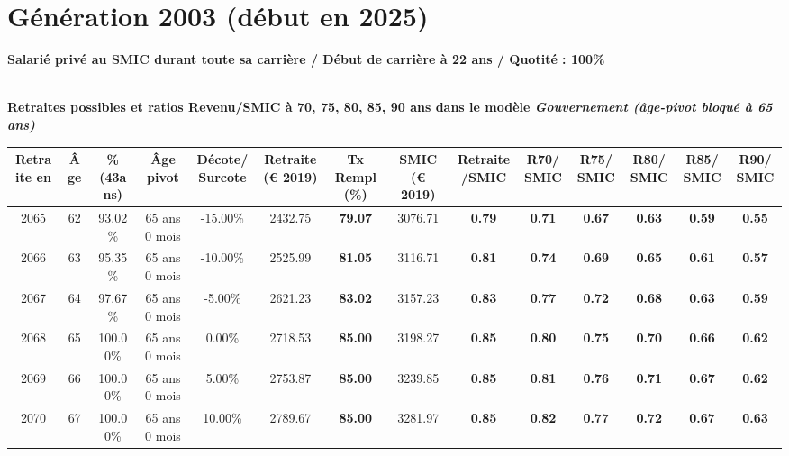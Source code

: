 \newpage 
 
\section{Génération 2003 (début en 2025)\label{SMIC_100_2003_22_0}} 
 
{\bf \noindent Salarié privé au SMIC durant toute sa carrière / Début de carrière à 22 ans / Quotité : 100\%}  ~ 

 ~\\{\bf \noindent Retraites possibles et ratios Revenu/SMIC à 70, 75, 80, 85, 90 ans dans le modèle \emph{Gouvernement (âge-pivot bloqué à 65 ans)}}  
 
\begin{adjustbox}{max width=\textwidth} 
\begin{tabular}[htb]{|c|c||c|c|c||c|c||c|c||c|c|c|c|c|} 
\hline 
 Retraite en &  Âge &  \%(43ans) &  Âge pivot &  Décote/Surcote &  Retraite (\euro{} 2019) &  Tx Rempl(\%) &  SMIC (\euro{} 2019) &  Retraite/SMIC &  R70/SMIC &  R75/SMIC &  R80/SMIC &  R85/SMIC &  R90/SMIC \\ 
\hline \hline 
 2065 &  62 &  93.02\% &  65 ans 0 mois &  -15.00\% &  2432.75 &  {\bf 79.07} &  3076.71 &  {\bf {\color{red} 0.79}} &  {\bf {\color{red} 0.71}} &  {\bf {\color{red} 0.67}} &  {\bf {\color{red} 0.63}} &  {\bf {\color{red} 0.59}} &  {\bf {\color{red} 0.55}} \\ 
\hline 
 2066 &  63 &  95.35\% &  65 ans 0 mois &  -10.00\% &  2525.99 &  {\bf 81.05} &  3116.71 &  {\bf {\color{red} 0.81}} &  {\bf {\color{red} 0.74}} &  {\bf {\color{red} 0.69}} &  {\bf {\color{red} 0.65}} &  {\bf {\color{red} 0.61}} &  {\bf {\color{red} 0.57}} \\ 
\hline 
 2067 &  64 &  97.67\% &  65 ans 0 mois &  -5.00\% &  2621.23 &  {\bf 83.02} &  3157.23 &  {\bf {\color{red} 0.83}} &  {\bf {\color{red} 0.77}} &  {\bf {\color{red} 0.72}} &  {\bf {\color{red} 0.68}} &  {\bf {\color{red} 0.63}} &  {\bf {\color{red} 0.59}} \\ 
\hline 
 2068 &  65 &  100.00\% &  65 ans 0 mois &  0.00\% &  2718.53 &  {\bf 85.00} &  3198.27 &  {\bf {\color{red} 0.85}} &  {\bf {\color{red} 0.80}} &  {\bf {\color{red} 0.75}} &  {\bf {\color{red} 0.70}} &  {\bf {\color{red} 0.66}} &  {\bf {\color{red} 0.62}} \\ 
\hline 
 2069 &  66 &  100.00\% &  65 ans 0 mois &  5.00\% &  2753.87 &  {\bf 85.00} &  3239.85 &  {\bf {\color{red} 0.85}} &  {\bf {\color{red} 0.81}} &  {\bf {\color{red} 0.76}} &  {\bf {\color{red} 0.71}} &  {\bf {\color{red} 0.67}} &  {\bf {\color{red} 0.62}} \\ 
\hline 
 2070 &  67 &  100.00\% &  65 ans 0 mois &  10.00\% &  2789.67 &  {\bf 85.00} &  3281.97 &  {\bf {\color{red} 0.85}} &  {\bf {\color{red} 0.82}} &  {\bf {\color{red} 0.77}} &  {\bf {\color{red} 0.72}} &  {\bf {\color{red} 0.67}} &  {\bf {\color{red} 0.63}} \\ 
\hline 
\hline 
\end{tabular} 
\end{adjustbox} 
 
